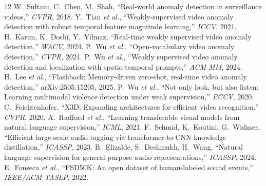 \documentclass[conference,a4paper]{IEEEtran}
\begin{document}
\begin{thebibliography}{12}
\footnotesize
\setlength{\itemsep}{0pt}
 W.~Sultani, C.~Chen, M.~Shah, ``Real-world anomaly detection in surveillance videos,'' \emph{CVPR}, 2018.
 Y.~Tian \emph{et al.}, ``Weakly-supervised video anomaly detection with robust temporal feature magnitude learning,'' \emph{ICCV}, 2021.
 H.~Karim, K.~Doshi, Y.~Yilmaz, ``Real-time weakly supervised video anomaly detection,'' \emph{WACV}, 2024.
 P.~Wu \emph{et al.}, ``Open-vocabulary video anomaly detection,'' \emph{CVPR}, 2024.
 P.~Wu \emph{et al.}, ``Weakly supervised video anomaly detection and localization with spatio-temporal prompts,'' \emph{ACM MM}, 2024.
 H.~Lee \emph{et al.}, ``Flashback: Memory-driven zero-shot, real-time video anomaly detection,'' arXiv:2505.15205, 2025.
 P.~Wu \emph{et al.}, ``Not only look, but also listen: Learning multimodal violence detection under weak supervision,'' \emph{ECCV}, 2020.
 C.~Feichtenhofer, ``X3D: Expanding architectures for efficient video recognition,'' \emph{CVPR}, 2020.
 A.~Radford \emph{et al.}, ``Learning transferable visual models from natural language supervision,'' \emph{ICML}, 2021.
 F.~Schmid, K.~Koutini, G.~Widmer, ``Efficient large-scale audio tagging via transformer-to-CNN knowledge distillation,'' \emph{ICASSP}, 2023.
 B.~Elizalde, S.~Deshmukh, H.~Wang, ``Natural language supervision for general-purpose audio representations,'' \emph{ICASSP}, 2024.
 E.~Fonseca \emph{et al.}, ``FSD50K: An open dataset of human-labeled sound events,'' \emph{IEEE/ACM TASLP}, 2022.
\end{thebibliography}
\end{document}
